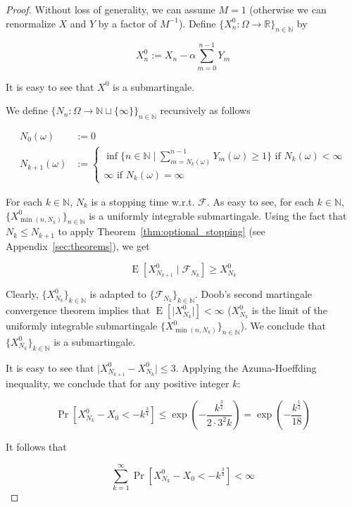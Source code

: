 \documentclass[aop,preprint]{imsart}
\numberwithin{equation}{section}
\theoremstyle{definition}
\theoremstyle{plain}
\newcommand{\Nats}{\mathbb{N}}
\newcommand{\Reals}{\mathbb{R}}
\newcommand{\A}[1]{\lvert #1 \rvert}
\newcommand{\Sq}[2]{\{#1\}_{#2 \in \Nats}}
\newcommand{\Sqn}[1]{\Sq{#1}{n}}
\DeclareMathOperator{\E}{E}
\newcommand{\F}{\mathcal{F}}
\begin{document}
\begin{proof}

Without loss of generality, we can assume ${M = 1}$ (otherwise we can renormalize ${X}$ and ${Y}$ by a factor of ${M^{-1}}$). Define ${\Sqn{X^0_n: \Omega \rightarrow \Reals}}$ by

$$X^0_n := X_n - \alpha \sum_{m=0}^{n-1} Y_m$$

It is easy to see that ${X^0}$ is a submartingale.

We define ${\Sqn{N_n:\Omega \rightarrow \Nats \sqcup \{\infty\}}}$ recursively as follows

\begin{align*}
N_0\left(\omega\right) &:= 0 \\ 
N_{k+1}\left(\omega\right) &:= \begin{cases}\inf \{n \in \Nats \mid \sum_{m=N_k\left(\omega\right)}^{n-1} Y_m\left(\omega\right) \geq 1\} \text{ if } N_k\left(\omega\right) < \infty\\\infty \text{ if } N_k\left(\omega\right) = \infty\end{cases}
\end{align*}

For each $k \in \Nats$, $N_k$ is a stopping time w.r.t. ${\F}$. As easy to see, for each $k \in \Nats$, ${\Sqn{X^0_{\min\left(n,N_k\right)}}}$ is a uniformly integrable submartingale. Using the fact that ${N_{k} \leq N_{k+1}}$ to apply Theorem~\ref{thm:optional_stopping} (see Appendix~\ref{sec:theorems}), we get

$$\E\left[X^0_{N_{k+1}} \mid \F_{N_k}\right] \geq X^0_{N_{k}}$$

Clearly, ${\Sq{X^0_{N_k}}{k}}$ is adapted to ${\Sq{\F_{N_k}}{k}}$. Doob's second martingale convergence theorem implies that ${\E\left[\A{X^0_{N_k}}\right] < \infty}$ (${X^0_{N_k}}$ is the limit of the uniformly integrable submartingale ${\Sqn{X^0_{\min\left(n,N_k\right)}}}$). We conclude that ${\Sq{X^0_{N_k}}{k}}$ is a submartingale.

It is easy to see that ${\A{X^0_{N_{k+1}}-X^0_{N_k}}} \leq 3$. Applying the Azuma-Hoeffding inequality, we conclude that for any positive integer ${k}$:

$$\Pr\left[X^0_{N_k} - X_0 < -k^{\frac{3}{4}}\right] \leq \exp\left(-\frac{k^{\frac{3}{2}}}{2 \cdot 3^2k}\right)=\exp\left(-\frac{k^{\frac{1}{2}}}{18}\right)$$

It follows that

$$\sum_{k=1}^\infty \Pr\left[X^0_{N_k} - X_0 < -k^{\frac{3}{4}}\right] < \infty$$


\end{proof}
\end{document}
